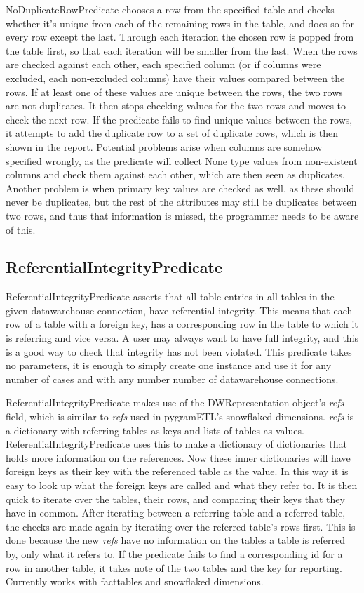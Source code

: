 NoDuplicateRowPredicate chooses a row from the specified table and checks whether it's unique from each of the remaining rows in the table, and does so for every row except the last. Through each iteration the chosen row is popped from the table first, so that each iteration will be smaller from the last. When the rows are checked against each other, each specified column (or if columns were excluded, each non-excluded columns) have their values compared between the rows. If at least one of these values are unique between the rows, the two rows are not duplicates. It then stops checking values for the two rows and moves to check the next row. If the predicate fails to find unique values between the rows, it attempts to add the duplicate row to a set of duplicate rows, which is then shown in the report. Potential problems arise when columns are somehow specified wrongly, as the predicate will collect None type values from non-existent columns and check them against each other, which are then seen as duplicates. Another problem is when primary key values are checked as well, as these should never be duplicates, but the rest of the attributes may still be duplicates between two rows, and thus that information is missed, the programmer needs to be aware of this.

\subsection{ReferentialIntegrityPredicate}
ReferentialIntegrityPredicate asserts that all table entries in all tables in the given datawarehouse connection, have referential integrity. This means that each row of a table with a foreign key, has a corresponding row in the table to which it is referring and vice versa. A user may always want to have full integrity, and this is a good way to check that integrity has not been violated. This predicate takes no parameters, it is enough to simply create one instance and use it for any number of cases and with any number number of datawarehouse connections.

ReferentialIntegrityPredicate makes use of the DWRepresentation object's \emph{refs} field, which is similar to \emph{refs} used in pygramETL's snowflaked dimensions. \emph{refs} is a dictionary with referring tables as keys and lists of tables as values. ReferentialIntegrityPredicate uses this to make a dictionary of dictionaries that holds more information on the references. Now these inner dictionaries will have foreign keys as their key with the referenced table as the value. In this way it is easy to look up what the foreign keys are called and what they refer to. It is then quick to iterate over the tables, their rows, and comparing their keys that they have in common. After iterating between a referring table and a referred table, the checks are made again by iterating over the referred table's rows first. This is done because the new \emph{refs} have no information on the tables a table is referred by, only what it refers to. If the predicate fails to find a corresponding id for a row in another table, it takes note of the two tables and the key for reporting. Currently works with facttables and snowflaked dimensions.
